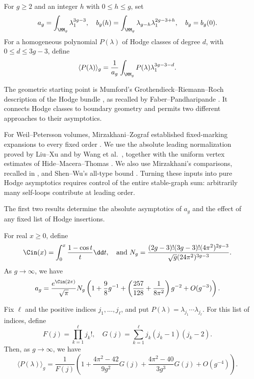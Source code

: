 For $g\geq2$ and an integer $h$ with $0\leq h\leq g$, set
\[a_g=\int_{\MM_g}\lambda_1^{3g-3},\quad b_g(h)=\int_{\MM_g}\lambda_{g-h} \lambda_1^{2g-3+h},
\quad b_g=b_g(0).\]
For a homogeneous polynomial $P(\lambda)$ of Hodge classes of degree
$d$, with $0\leq d\leq3g-3$, define
\[\langle P(\lambda) \rangle_g=\frac{1}{a_g}\int_{\MM_g} P(\lambda)\lambda_1^{3g-3-d}.\]

The geometric starting point is Mumford's
Grothendieck--Riemann--Roch description of the Hodge bundle
\cite[\S 5]{Mum83}, as recalled by
Faber--Pandharipande \cite[\S 1.1]{FP00}. It connects Hodge classes
to boundary geometry and permits two different approaches to
their asymptotics.

For Weil--Petersson volumes, Mirzakhani--Zograf established
fixed-marking expansions to every fixed order
\cite[Theorem 1.2]{MZ15}. We use the absolute leading normalization
proved by Liu--Xu \cite[Corollary 1.2]{LX26} and by Wang et al.\
\cite[Corollary 1.2]{W26}, together with the uniform vertex
estimates of Hide--Macera--Thomas \cite[Theorem 4.2]{HMT25}.
We also use Mirzakhani's comparisons, recalled in \cite[Lemma 14]{SW25},
and Shen--Wu's all-type bound \cite[Lemma 18]{SW25}.
Turning these inputs into pure Hodge asymptotics requires control
of the entire stable-graph sum: arbitrarily many self-loops
contribute at leading order.

The first two results determine the absolute asymptotics of $a_g$
and the effect of any fixed list of Hodge insertions.

\begin{thm}
\label{thm:lambda-one}
For real $x\geq0$, define
\[\Cin(x)=\int_0^x \frac{1-\cos t}{t}\dd t, \quad
\mbox{and } N_g=\frac{(2g-3)!(3g-3)!(4\pi^2)^{2g-3}}{\sqrt{g}(24\pi^2)^{3g-3}}.\]
As $g\to \infty$, we have
\begin{equation}
a_g=\frac{e^{\Cin(2\pi)}}{\sqrt{\pi}}N_g
\left(1+\frac{9}{8}g^{-1}+\left(\frac{257}{128}+\frac{1}{8\pi^2}\right)g^{-2}+O(g^{-3})\right).
\label{eq:111}
\end{equation}
\end{thm}

\begin{thm}
\label{thm:fixed-insertions}
Fix $\ell$ and the positive indices $j_1,\ldots,j_\ell$, and put
$P(\lambda)=\lambda_{j_1}\cdots\lambda_{j_\ell}$.  For this list of
indices, define
\[F(j)=\prod_{k=1}^\ell j_k!, \quad G(j)=\sum_{k=1}^\ell j_k(j_k-1)(j_k-2).\]
Then, as $g\to\infty$, we have
\begin{equation}
\langle P(\lambda) \rangle_g=\frac{1}{F(j)}\left(1+\frac{4\pi^2-42}{9g^2}G(j)+
\frac{4\pi^2-40}{3g^3}G(j)+O(g^{-4})\right).
\label{eq:P111}
\end{equation}
\end{thm}

